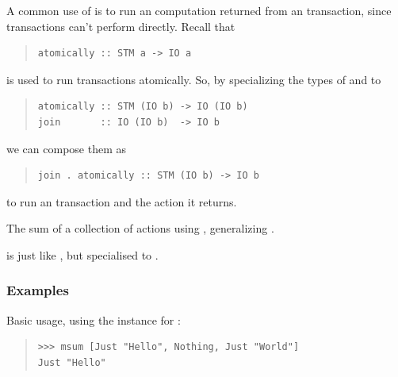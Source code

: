 \begin{haddockdesc}
{\begin{quote}
{\begin{verbatim}
\end{verbatim}}
\end{quote}
A common use of  is to run an  computation returned from
 an  transaction, since  transactions
 can't perform  directly. Recall that\par
\begin{quote}
{\haddockverb\begin{verbatim}
atomically :: STM a -> IO a
\end{verbatim}}
\end{quote}
is used to run  transactions atomically. So, by
 specializing the types of  and  to\par
\begin{quote}
{\haddockverb\begin{verbatim}
atomically :: STM (IO b) -> IO (IO b)
join       :: IO (IO b)  -> IO b
\end{verbatim}}
\end{quote}
we can compose them as\par
\begin{quote}
{\haddockverb\begin{verbatim}
join . atomically :: STM (IO b) -> IO b
\end{verbatim}}
\end{quote}
to run an  transaction and the  action it
 returns.\par}
\end{haddockdesc}
\begin{haddockdesc}
\item[\begin{tabular}{@{}l}
msum :: (Foldable t, MonadPlus m) => t (m a) -> m a
\end{tabular}]
{\haddockbegindoc
The sum of a collection of actions using \haddockid{(<|>)}, generalizing .\par
{} is just like , but specialised to .\par
\subsubsection*{\textbf{Examples}}
Basic usage, using the  instance for :\par
\begin{quote}
{\haddockverb\begin{verbatim}
>>> msum [Just "Hello", Nothing, Just "World"]
Just "Hello"

\end{verbatim}}
\end{quote}}
\end{haddockdesc}
